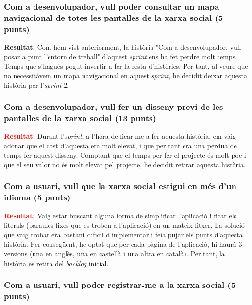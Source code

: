 \documentclass[11pt,catalan,listoffigures,listoftables]{tfgetsinf}
\begin{document}
\subsubsection{Com a desenvolupador, vull poder consultar un mapa navigacional de totes les pantalles de la xarxa social (5 punts)}

\textcolor{costumyellow}{\textbf{Resultat:}} Com hem vist anteriorment, la història "Com a desenvolupador, vull posar a punt l'entorn de treball" d'aquest \textit{sprint} ens ha fet perdre molt temps. Temps que s'hagués pogut invertir a fer la resta d'històries. Per tant, al veure que no necessitàvem un mapa navigacional en aquest \textit{sprint}, he decidit deixar aquesta història per l'\textit{sprint} 2.

\subsubsection{Com a desenvolupador, vull fer un disseny previ de les pantalles de la xarxa social (13 punts)}

\textcolor{red}{\textbf{Resultat:}} Durant l'\textit{sprint}, a l'hora de ficar-me a fer aquesta història, em vaig adonar que el cost d'aquesta era molt elevat, i que per tant era una pèrdua de temps fer aquest disseny. Comptant que el temps per fer el projecte és molt poc i que el seu valor no és molt elevat pel projecte, he decidit retirar aquesta història.

\subsubsection{Com a usuari, vull que la xarxa social estigui en més d'un idioma (5 punts)}

\textcolor{red}{\textbf{Resultat:}} Vaig estar buscant alguna forma de simplificar l'aplicació i ficar els literals (paraules fixes que es troben a l'aplicació) en un mateix fitxer. La solució que vaig trobar era bastant difícil d'implementar i feia pujar els punts d'aquesta història. Per consegüent, he optat que per cada pàgina de l'aplicació, hi haurà 3 versions (una en anglès, una en castellà i una altra en català). Per tant, la història es retira del \textit{backlog} inicial.

\subsubsection{Com a usuari, vull poder registrar-me a la xarxa social (5 punts)}
\end{document}
